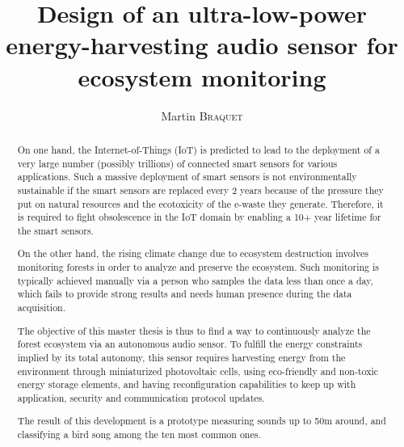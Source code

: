 \documentclass{EPL-master-thesis-covers-EN}
\title{Design of an ultra-low-power energy-harvesting audio sensor for ecosystem monitoring}
\author{Martin \textsc{Braquet}}
\begin{document}
\hypersetup{pageanchor=false}

\maketitle

\begin{abstract}

On one hand, the Internet-of-Things (IoT) is predicted to lead to the deployment of a very large number (possibly trillions) of connected smart sensors for various applications. Such a massive deployment of smart sensors is not environmentally sustainable if the smart sensors are replaced every 2 years because of the pressure they put on natural resources and the ecotoxicity of the e-waste they generate. Therefore, it is required to fight obsolescence in the IoT domain by enabling a 10+ year lifetime for the smart sensors.

On the other hand, the rising climate change due to ecosystem destruction involves monitoring forests in order to analyze and preserve the ecosystem. Such monitoring is typically achieved manually via a person who samples the data less than once a day, which fails to provide strong results and needs human presence during the data acquisition.

The objective of this master thesis is thus to find a way to continuously analyze the forest ecosystem via an autonomous audio sensor. To fulfill the energy constraints implied by its total autonomy, this sensor requires harvesting energy from the environment through miniaturized photovoltaic cells, using eco-friendly and non-toxic energy storage elements, and having reconfiguration capabilities to keep up with application, security and communication protocol updates.

The result of this development is a prototype measuring sounds up to 50m around, and classifying a bird song among the ten most common ones.
\end{abstract}
\end{document}
